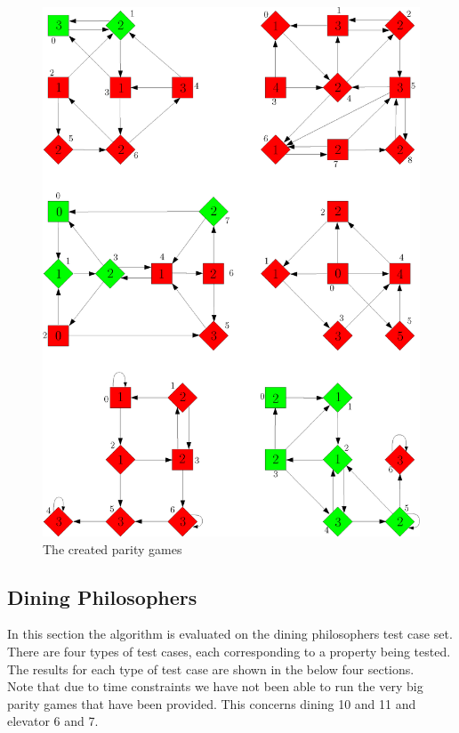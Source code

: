 \documentclass[10pt,a4paper]{article}
\begin{document}
\begin{figure}
\centering
\includegraphics[width=\textwidth]{paritygames.png}
\caption{The created parity games}
\label{paritygames}
\end{figure}


\subsection{Dining Philosophers}
In this section the algorithm is evaluated on the dining philosophers test case set. There are four types of test cases, each corresponding to a property being tested. The results for each type of test case are shown in the below four sections.\\
Note that due to time constraints we have not been able to run the very big parity games that have been provided. This concerns dining 10 and 11 and elevator 6 and 7.
\end{document}
